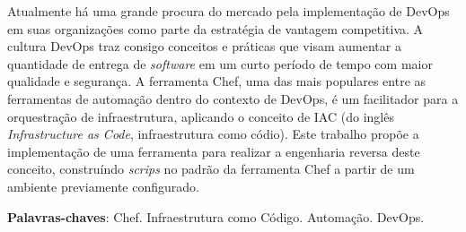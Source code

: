 \newpage\null\thispagestyle{empty}\newpage
\begin{resumo}
  Atualmente há uma grande procura do mercado pela implementação de
  DevOps em suas organizações como parte da estratégia de vantagem
  competitiva. A cultura DevOps traz consigo conceitos e práticas
  que visam aumentar a quantidade de entrega de \textit{software} em um
  curto período de tempo com maior qualidade e segurança. A
  ferramenta Chef, uma das mais populares entre as ferramentas de
  automação dentro do contexto de DevOps, é um facilitador para
  a orquestração de infraestrutura, aplicando o conceito de
  IAC (do inglês \textit{Infrastructure as Code}, infraestrutura como códio). 
  Este trabalho propõe a implementação de uma ferramenta para realizar a 
  engenharia reversa deste conceito, construíndo \textit{scrips} no padrão da 
  ferramenta Chef a partir de um ambiente previamente configurado.

  \vspace{\onelineskip}
  \noindent
   \textbf{Palavras-chaves}: Chef. Infraestrutura como Código. Automação. DevOps.
\end{resumo}
